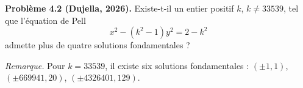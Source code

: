\textbf{Problème 4.2 (Dujella, 2026).} Existe-t-il un entier positif $k$, $k \neq 33539$, tel que l'équation de Pell
\[
x^2-(k^2-1)y^2=2-k^2
\]
admette plus de quatre solutions fondamentales ?

\medskip

\textit{Remarque.} Pour $k=33539$, il existe six solutions fondamentales : $(\pm 1,1)$, $(\pm 669941,20)$, $(\pm 4326401,129)$.

